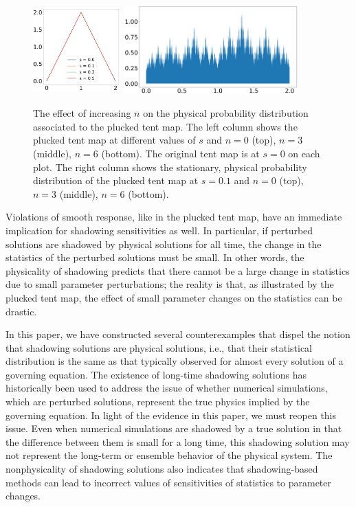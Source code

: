 \begin{figure}
    \includegraphics[width=0.3\textwidth,height=1.35in]{osc_tent_6.png}
     \includegraphics[width=0.6\textwidth,height=1.35in]{osc_tent_dens_0.1_6.png}
    \caption{
    The effect of increasing $n$ on the physical probability distribution associated to the plucked tent map. The left column shows the plucked tent map at 
    different values of $s$ and $n = 0$ (top), $n=3$ (middle), $n=6$ (bottom). The original tent map is at $s=0$ on each plot.
    The right column shows the stationary, physical probability distribution of the plucked tent map at $s=0.1$ and $n = 0$ (top), $n=3$ (middle), $n = 6$ (bottom).}
    \label{fig:pluckedTentMap}
\end{figure}


Violations of smooth response, like in the plucked tent map, have an immediate implication for shadowing sensitivities as well. In particular, if perturbed solutions are shadowed by physical solutions for all time, the change in the statistics of the perturbed solutions must be small. In other words, the physicality of shadowing predicts that there cannot be a large change in statistics due to small parameter perturbations; the reality is that, as illustrated by the plucked tent map, the effect of small parameter changes on the statistics can be drastic.  


In this paper, we have constructed several counterexamples that 
dispel the notion that shadowing solutions are physical solutions, i.e., that their 
statistical distribution is the same as that typically observed for almost every solution 
of a governing equation. The existence of long-time shadowing solutions \cite{grebogi} has historically been used to address the issue of whether numerical simulations, which are 
perturbed solutions, represent the true physics implied by the governing equation. In light of the evidence in this paper, we must reopen this issue. Even when numerical simulations are 
shadowed by a true solution in that the difference between them is small for a long time, this shadowing solution may not represent the long-term or ensemble behavior of the physical system. The nonphysicality of shadowing solutions also indicates that shadowing-based methods can lead to incorrect values of sensitivities of statistics to parameter changes. 



